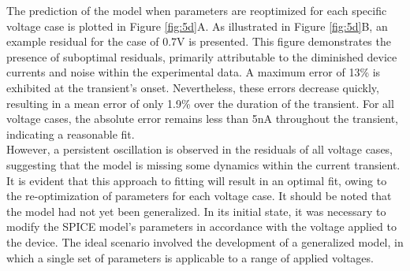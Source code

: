 \noindent The prediction of the model when parameters are reoptimized for each specific voltage case is plotted in Figure \ref{fig:5d}A. As illustrated in Figure \ref{fig:5d}B, an example residual for the case of 0.7V is presented. This figure demonstrates the presence of suboptimal residuals, primarily attributable to the diminished device currents and noise within the experimental data. A maximum error of 13\% is exhibited at the transient's onset. Nevertheless, these errors decrease quickly, resulting in a mean error of only 1.9\% over the duration of the transient. For all voltage cases, the absolute error remains less than 5nA throughout the transient, indicating a reasonable fit. \\

\noindent However, a persistent oscillation is observed in the residuals of all voltage cases, suggesting that the model is missing some dynamics within the current transient. It is evident that this approach to fitting will result in an optimal fit, owing to the re-optimization of parameters for each voltage case. It should be noted that the model had not yet been generalized. In its initial state, it was necessary to modify the SPICE model's parameters in accordance with the voltage applied to the device. The ideal scenario involved the development of a generalized model, in which a single set of parameters is applicable to a range of applied voltages.\\

